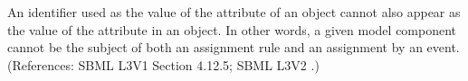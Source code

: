 An identifier used as the value of the attribute  of an
\EventAssignment object cannot also appear as the value of the
 attribute in an \AssignmentRule object.  In other words, a
given model component cannot be the subject of both an assignment rule and
an assignment by an event.  (References: SBML L3V1 Section 4.12.5; SBML L3V2
.)
